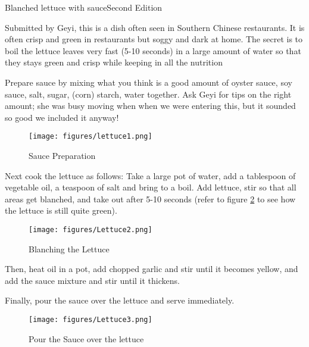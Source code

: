 \begin{entry}{Blanched lettuce with sauce}{Second Edition}

\begin{open}
  Submitted by Geyi, this is a dish often seen in Southern Chinese restaurants. It is often crisp and green in restaurants but soggy and dark at home. The secret is to boil the lettuce leaves very fast (5-10 seconds) in a large amount of water so that they stays green and crisp while keeping in all the nutrition 
\end{open}
\begin{ingredients}

\end{ingredients}
Prepare sauce by mixing what you think is a good amount of oyster sauce, soy sauce, salt, sugar, (corn) starch, water together. Ask Geyi for tips on the right amount; she was busy moving when when we were entering this, but it sounded so good we included it anyway!

\begin{figure}[h]
    \centering
    \texttt{[image: figures/lettuce1.png]}
    \caption{Sauce Preparation}
    \label{fig:Lettuce1}
\end{figure}

Next cook the lettuce as follows: Take a large pot of water, add a tablespoon of vegetable oil, a teaspoon of salt and bring to a boil. Add lettuce, stir so that all areas get blanched, and take out after 5-10 seconds (refer to figure \ref{fig:lettuce2} to see how the lettuce is still quite green).
 
\begin{figure}
    \centering
    \texttt{[image: figures/Lettuce2.png]}
    \caption{Blanching the Lettuce}
    \label{fig:lettuce2}
\end{figure}
 
Then, heat oil in a pot, add chopped garlic and stir until it becomes yellow, and add the sauce mixture and stir until it thickens. 

Finally, pour the sauce over the lettuce and serve immediately.

\begin{figure}
    \centering
    \texttt{[image: figures/Lettuce3.png]}
    \caption{Pour the Sauce over the lettuce}
    \label{fig:lettuce3}
\end{figure}


\end{entry}

